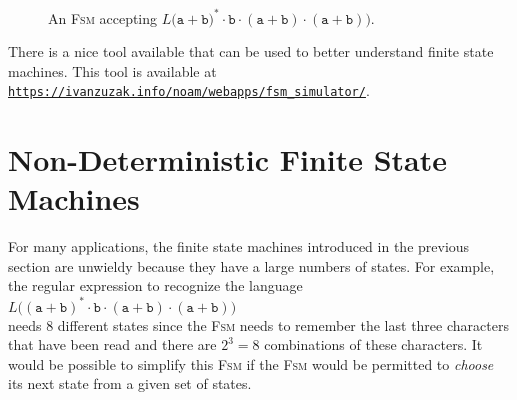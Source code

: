  \begin{figure}[!ht]
   \centering
    \caption{An \textsc{Fsm} accepting
             $L\bigl(\texttt{a}+\texttt{b})^* \cdot \texttt{b} \cdot (\texttt{a}+\texttt{b}) \cdot (\texttt{a}+\texttt{b})\bigr)$.}
   \label{fig:abstarbabab.dot}
 \end{figure}

\remarkEng
There is a nice tool available that can be used to better understand finite state machines.  This
tool is available at
\\[0.2cm]
\hspace*{1.3cm}
\href{https://ivanzuzak.info/noam/webapps/fsm_simulator/}{\texttt{https://ivanzuzak.info/noam/webapps/fsm\_simulator/}}.


\section{Non-Deterministic Finite State Machines}
For many applications, the finite state machines introduced in the previous section are unwieldy
because they have a large numbers of states.  For example, the regular expression to recognize the language
\\[0.2cm]
\hspace*{1.3cm}
$L\bigl((\texttt{a}+\texttt{b})^* \cdot \texttt{b} \cdot (\texttt{a}+\texttt{b}) \cdot (\texttt{a}+\texttt{b})\bigr)$ 
\\[0.2cm]
needs 8 different states since the \textsc{Fsm} needs to remember the last three characters that
have been read and there are $2^3 = 8$ combinations of these characters.  
It would be possible to simplify this \textsc{Fsm} if the \textsc{Fsm} would be permitted to \emph{choose} its
next state from a given set of states.

